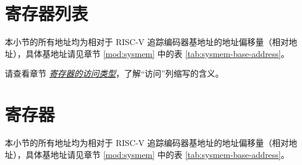 \documentclass[main\_\_CN.tex]{subfiles}
\begin{document}



\clearpage
\hypertarget{riscvtracenc-reg-summ}{}
\section{寄存器列表}
\label{sec:riscvtracenc-reg-summ}

本小节的所有地址均为相对于 RISC-V 追踪编码器基地址的地址偏移量（相对地址），具体基地址请见章节 \ref{mod:sysmem} \textit{} 中的表 \ref{tab:sysmem-base-address}。

请查看章节 \hyperref[glossary-access-types]{\textit{寄存器的访问类型}}，了解“访问”列缩写的含义。






\clearpage
\section{寄存器}

本小节的所有地址均为相对于 RISC-V 追踪编码器基地址的地址偏移量（相对地址），具体基地址请见章节 \ref{mod:sysmem} \textit{} 中的表 \ref{tab:sysmem-base-address}。


\end{document}
